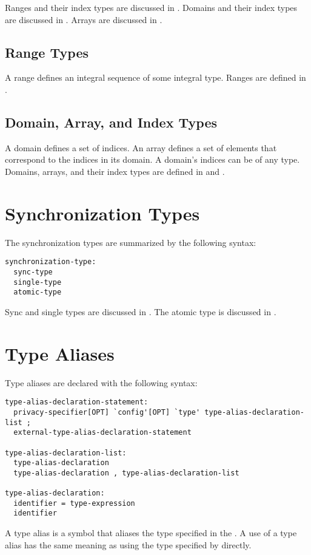 Ranges and their index types are discussed in .
Domains and their index types are discussed in .
Arrays are discussed in .

\subsection{Range Types}
\label{Types_Range_Types}

A range defines an integral sequence of some integral type.  Ranges
are defined in .

\subsection{Domain, Array, and Index Types}
\label{Domain_and_Array_Types}

A domain defines a set of indices. An array defines a set of
elements that correspond to the indices in its domain.
A domain's indices can be of any type.
Domains, arrays, and their index
types are defined in  and .

\section{Synchronization Types}
\label{Synchronization_Types}

The synchronization types are summarized by the following syntax:

\begin{syntax}
\begin{verbatim}
synchronization-type:
  sync-type
  single-type
  atomic-type
\end{verbatim}
\end{syntax}

Sync and single types are discussed in .
The atomic type is discussed in .

\clearpage
\section{Type Aliases}
\label{Type_Aliases}

Type aliases are declared with the following syntax:
\begin{syntax}
\begin{verbatim}
type-alias-declaration-statement:
  privacy-specifier[OPT] `config'[OPT] `type' type-alias-declaration-list ;
  external-type-alias-declaration-statement

type-alias-declaration-list:
  type-alias-declaration
  type-alias-declaration , type-alias-declaration-list

type-alias-declaration:
  identifier = type-expression
  identifier
\end{verbatim}
\end{syntax}
A type alias is a symbol that aliases the type specified in the
.  A use of a type alias has the same meaning as using
the type specified by  directly.

